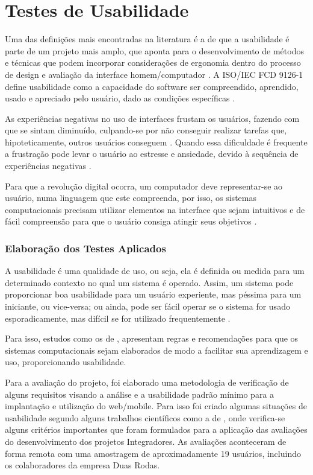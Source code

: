 \chapter{Testes de Usabilidade}

Uma das definições mais encontradas na literatura é a de que a usabilidade é parte de um projeto mais amplo, que aponta para o desenvolvimento de métodos e técnicas que podem incorporar considerações de ergonomia dentro do processo de design e avaliação da interface homem/computador \cite{bastien1993ergonomic}. A ISO/IEC FCD 9126-1 define usabilidade como a capacidade do software ser compreendido, aprendido, usado e apreciado pelo usuário, dado as condições específicas \cite{gonccalves2009usabilidade}.

As experiências negativas no uso de interfaces frustam os usuários, fazendo com que se sintam diminuído, culpando-se por não conseguir realizar tarefas que, hipoteticamente, outros usuários conseguem \cite{gonccalves2009usabilidade}. Quando essa dificuldade é frequente a frustração pode levar o usuário ao estresse e ansiedade, devido à sequência de experiências negativas \cite{cybis2003engenharia}.

Para que a revolução digital ocorra, um computador deve representar-se ao usuário, numa linguagem que este compreenda, por isso, os sistemas computacionais precisam utilizar elementos na interface que sejam intuitivos e de fácil compreensão para que o usuário consiga atingir seus objetivos \cite{johnson2001cultura}.

\subsection{Elaboração dos Testes Aplicados}

A usabilidade é uma qualidade de uso, ou seja, ela é definida ou medida para um determinado contexto no qual um sistema é operado. Assim, um sistema pode proporcionar boa usabilidade para um usuário experiente, mas péssima para um iniciante, ou vice-versa; ou ainda, pode ser fácil operar se o sistema for usado esporadicamente, mas difícil se for utilizado frequentemente \cite{cybis2003engenharia}.

Para isso, estudos como os de \cite{bastien1993ergonomic}, apresentam regras e recomendações para que os sistemas computacionais sejam elaborados de modo a facilitar sua aprendizagem e uso, proporcionando usabilidade.

Para a avaliação do projeto, foi elaborado uma metodologia de verificação de alguns requisitos visando a análise e a usabilidade padrão mínimo para a implantação e utilização do web/mobile. Para isso foi criado algumas situações de usabilidade segundo alguns trabalhos científicos como a de \cite{silva2016principios}, onde verifica-se alguns critérios importantes que foram formulados para a aplicação das avaliações do desenvolvimento dos projetos Integradores. As avaliações aconteceram de forma remota com uma amostragem de aproximadamente 19 usuários, incluindo os colaboradores da empresa Duas Rodas.


